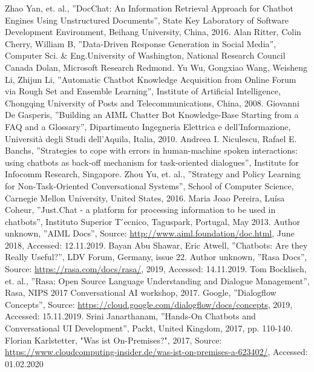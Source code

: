 \documentclass[10pt,final,journal,a4paper,oneside,twocolumn]{IEEEtran}
\begin{document}
\begin{thebibliography}{00}
 Zhao Yan, et. al., ''DocChat: An Information Retrieval Approach for Chatbot Engines Using Unstructured Documents'', State Key Laboratory of Software Development Environment, Beihang University, China, 2016.
 Alan Ritter, Colin Cherry, William B, ''Data-Driven Response Generation in Social Media'', Computer Sci. \& Eng.University of Washington, National Research Council Canada Dolan, Microsoft Research Redmond.
 Yu Wu, Gongxiao Wang, Weisheng Li, Zhijun Li, ''Automatic Chatbot Knowledge Acquisition from Online Forum via Rough Set and Ensemble Learning'',  Institute  of  Artificial Intelligence, Chongqing University of Posts and Telecommunications, China, 2008.
 Giovanni De Gasperis, ''Building an AIML Chatter Bot Knowledge-Base Starting from a FAQ and a Glossary'', Dipartimento Ingegneria Elettrica e dell’Informazione, Università degli Studi dell’Aquila, Italia, 2010.
 Andreea I. Niculescu, Rafael E. Banchs, ''Strategies to cope with errors in human-machine spoken interactions: using chatbots as back-off mechanism for task-oriented dialogues'', Institute for Infocomm Research, Singapore.
 Zhou Yu, et. al., ''Strategy and Policy Learning for Non-Task-Oriented Conversational Systems'', School of Computer Science, Carnegie Mellon University, United States, 2016.
 Maria Joao Pereira, Luísa Coheur, ''Just.Chat - a platform for processing information to be used in chatbots'', Instituto Superior T ́ecnico, Taguspark, Portugal, May 2013.
 Author unknown, ''AIML Docs'', Source: \href{http://www.aiml.foundation/doc.html}{http://www.aiml.foundation/doc.html}, June 2018, Accessed: 12.11.2019.
 Bayan Abu Shawar, Eric Atwell, ''Chatbots: Are they Really Useful?'', LDV Forum, Germany, issue 22.
 Author unknown, ''Rasa Docs'', Source: \href{https://rasa.com/docs/rasa/}{https://rasa.com/docs/rasa/}, 2019, Accessed: 14.11.2019.
 Tom Bocklisch, et. al., ''Rasa: Open Source Language Understanding and Dialogue Management'', Rasa, NIPS 2017 Conversational AI workshop, 2017.
 Google, ''Dialogflow Concepts'', Source: \href{https://cloud.google.com/dialogflow/docs/concepts}{https://cloud.google.com/dialogflow/docs/concepts}, 2019, Accessed: 15.11.2019.
 Srini Janarthanam, ''Hands-On Chatbots and Conversational UI Development'', Packt, United Kingdom, 2017, pp. 110-140.
  Florian Karlstetter, "Was ist On-Premises?", 2017, Source: \href{https://www.cloudcomputing-insider.de/was-ist-on-premises-a-623402/}{https://www.cloudcomputing-insider.de/was-ist-on-premises-a-623402/}, Accessed: 01.02.2020

\end{thebibliography}
\end{document}
